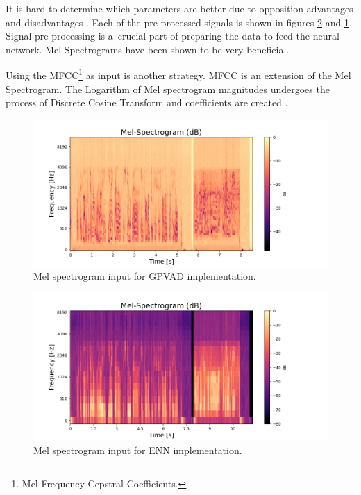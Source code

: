     It is hard to determine which parameters are better due to opposition advantages and disadvantages \cite{BENZEGHIBA2007763}. Each of the pre-processed signals is shown in figures \ref{fig:Melspec_FNN} and \ref{fig:Melspec_GPVAD}. Signal pre-processing is a~crucial part of preparing the data to feed the neural network. Mel Spectrograms have been shown to be very beneficial. 

    \newpage
    
    Using the MFCC\footnote{Mel Frequency Cepstral Coefficients.} as input is another strategy. MFCC is an extension of the Mel Spectrogram. The Logarithm of Mel spectrogram magnitudes undergoes the process of Discrete Cosine Transform and coefficients are created \cite{MFCCs}. 

    \begin{figure}[ht!]
        \centering
        \includegraphics[width = \textwidth]{obrazky-figures/GPVAD.png}
        \caption{Mel spectrogram input for GPVAD implementation.}
        \label{fig:Melspec_GPVAD}
    \end{figure}

    \begin{figure}[ht!]
        \centering
        \includegraphics[width = \textwidth]{obrazky-figures/FNN.png}
        \caption{Mel spectrogram input for ENN implementation.}
        \label{fig:Melspec_FNN}
    \end{figure}

